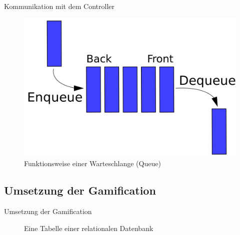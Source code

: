 \documentclass[hyphens]{beamer}
\begin{document}
\begin{frame}{Kommunikation mit dem Controller}
	\begin{figure}
		\includegraphics[scale=0.28]{pics/queue}
		\caption{Funktionsweise einer Warteschlange (Queue)}
	\end{figure}
\end{frame}

\subsection{Umsetzung der Gamification}

\begin{frame}{Umsetzung der Gamification}
\begin{figure}
	
	\caption{Eine Tabelle einer relationalen Datenbank}
\end{figure}
\end{frame}
\end{document}
